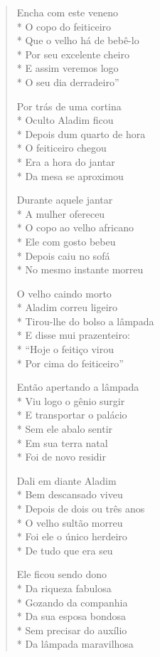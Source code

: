 \begin{verse}
Encha com este veneno\\*
O copo do feiticeiro\\*
Que o velho há de bebê-lo\\*
Por seu excelente cheiro\\*
E assim veremos logo\\*
O seu dia derradeiro''

Por trás de uma cortina\\*
Oculto Aladim ficou\\*
Depois dum quarto de hora\\*
O feiticeiro chegou\\*
Era a hora do jantar\\*
Da mesa se aproximou

Durante aquele jantar\\*
A mulher ofereceu\\*
O copo ao velho africano\\*
Ele com gosto bebeu\\*
Depois caiu no sofá\\*
No mesmo instante morreu

O velho caindo morto\\*
Aladim correu ligeiro\\*
Tirou-lhe do bolso a lâmpada\\*
E disse mui prazenteiro:\\*
``Hoje o feitiço virou\\*
Por cima do feiticeiro''

Então apertando a lâmpada\\*
Viu logo o gênio surgir\\*
E transportar o palácio\\*
Sem ele abalo sentir\\*
Em sua terra natal\\*
Foi de novo residir

Dali em diante Aladim\\*
Bem descansado viveu\\*
Depois de dois ou três anos\\*
O velho sultão morreu\\*
Foi ele o único herdeiro\\*
De tudo que era seu

Ele ficou sendo dono\\*
Da riqueza fabulosa\\*
Gozando da companhia\\*
Da sua esposa bondosa\\*
Sem precisar do auxílio\\*
Da lâmpada maravilhosa


\end{verse}
